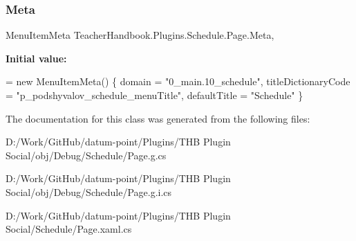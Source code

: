 \subsubsection{\texorpdfstring{Meta}{Meta}}
{\footnotesize\ttfamily Menu\+Item\+Meta Teacher\+Handbook.\+Plugins.\+Schedule.\+Page.\+Meta\hspace{0.3cm}{\ttfamily [get]}, {\ttfamily [set]}}

{\bfseries Initial value\+:}
\begin{DoxyCode}
= \textcolor{keyword}{new} MenuItemMeta() \{
            domain = \textcolor{stringliteral}{"0\_main.10\_schedule"},
            titleDictionaryCode = \textcolor{stringliteral}{"p\_podshyvalov\_schedule\_menuTitle"},
            defaultTitle = \textcolor{stringliteral}{"Schedule"} \}
\end{DoxyCode}


The documentation for this class was generated from the following files\+:\begin{DoxyCompactItemize}
\item 
D\+:/\+Work/\+Git\+Hub/datum-\/point/\+Plugins/\+T\+H\+B Plugin Social/obj/\+Debug/\+Schedule/Page.\+g.\+cs\item 
D\+:/\+Work/\+Git\+Hub/datum-\/point/\+Plugins/\+T\+H\+B Plugin Social/obj/\+Debug/\+Schedule/Page.\+g.\+i.\+cs\item 
D\+:/\+Work/\+Git\+Hub/datum-\/point/\+Plugins/\+T\+H\+B Plugin Social/\+Schedule/Page.\+xaml.\+cs\end{DoxyCompactItemize}
